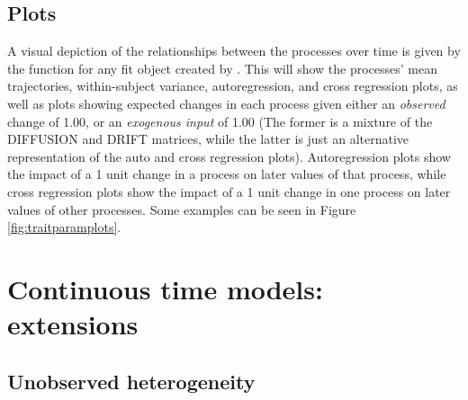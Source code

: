 \documentclass[nojss]{jss}\usepackage[]{graphicx}\usepackage[]{color}
\begin{document}
\subsection{Plots}\nopagebreak
A visual depiction of the relationships between the processes over time is given by the  function for any fit object created by . This will show the processes' mean trajectories, within-subject variance, autoregression, and cross regression plots, as well as plots showing expected changes in each process given either an \textit{observed} change of 1.00, or an \textit{exogenous input} of 1.00 (The former is a mixture of the DIFFUSION and DRIFT matrices, while the latter is just an alternative representation of the auto and cross regression plots). Autoregression plots show the impact of a 1 unit change in a process on later values of that process, while cross regression plots show the impact of a 1 unit change in one process on later values of other processes. Some examples can be seen in Figure \ref{fig:traitparamplots}.

\section{Continuous time models: extensions} \label{sec:extensions}\nopagebreak
\subsection{Unobserved heterogeneity}\nopagebreak
\end{document}
